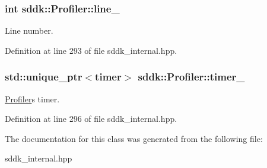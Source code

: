 \subsubsection[{line\+\_\+}]{\setlength{\rightskip}{0pt plus 5cm}int sddk\+::\+Profiler\+::line\+\_\+\hspace{0.3cm}{\ttfamily [private]}}\label{classsddk_1_1_profiler_a9a3f56b94bb94e03aa901d2d272e21fa}


Line number. 



Definition at line 293 of file sddk\+\_\+internal.\+hpp.

\hypertarget{classsddk_1_1_profiler_a08fe0cc2c8a01af25c32303f7fe76208}{}
\subsubsection[{timer\+\_\+}]{\setlength{\rightskip}{0pt plus 5cm}std\+::unique\+\_\+ptr$<${\bf timer}$>$ sddk\+::\+Profiler\+::timer\+\_\+\hspace{0.3cm}{\ttfamily [private]}}\label{classsddk_1_1_profiler_a08fe0cc2c8a01af25c32303f7fe76208}


\hyperlink{classsddk_1_1_profiler}{Profiler}\textquotesingle{}s timer. 



Definition at line 296 of file sddk\+\_\+internal.\+hpp.



The documentation for this class was generated from the following file\+:\begin{DoxyCompactItemize}
\item 
sddk\+\_\+internal.\+hpp\end{DoxyCompactItemize}
